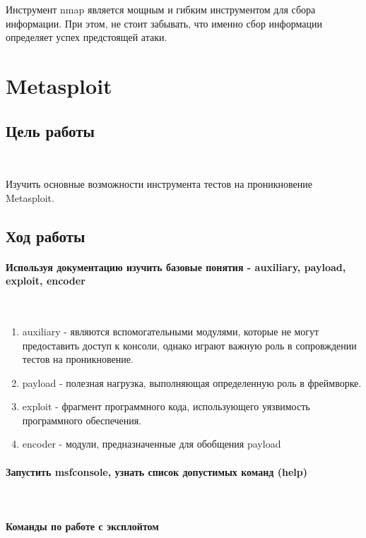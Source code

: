 \documentclass{article}
\begin{document}
Инструмент nmap является мощным и гибким инструментом для сбора информации. При этом, не стоит забывать, что именно сбор информации определяет успех предстоящей атаки.

\section{Metasploit}

\subsection{Цель работы}
~

Изучить основные возможности инструмента тестов на проникновение Metasploit.
\subsection{Ход работы}

\paragraph{Используя документацию изучить базовые понятия - auxiliary, payload, exploit, encoder}
~

\begin{enumerate}
\item auxiliary - являются вспомогательными модулями, которые не могут предоставить доступ к консоли, однако играют важную роль в сопровждении тестов на проникновение.

\item payload - полезная нагрузка, выполняющая определенную роль в фреймворке.

\item exploit - фрагмент программного кода, использующего уязвимость программного обеспечения.

\item encoder - модули, предназначенные для обобщения payload
\end{enumerate}

\paragraph{Запустить msfconsole, узнать список допустимых команд (help)}
~

\paragraph{Команды по работе с эксплойтом}
~
\end{document}
